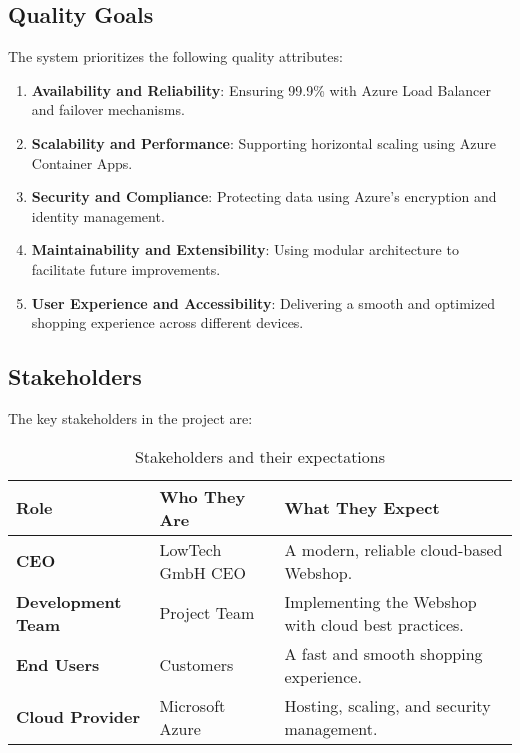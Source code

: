 \subsection{Quality Goals}
The system prioritizes the following quality attributes:

\begin{enumerate}
    \item \textbf{Availability and Reliability}: Ensuring 99.9\% with Azure Load Balancer and failover mechanisms.
    \item \textbf{Scalability and Performance}: Supporting horizontal scaling using Azure Container Apps.
    \item \textbf{Security and Compliance}: Protecting data using Azure’s encryption and identity management.
    \item \textbf{Maintainability and Extensibility}: Using modular architecture to facilitate future improvements.
    \item \textbf{User Experience and Accessibility}: Delivering a smooth and optimized shopping experience across different devices.
\end{enumerate}

\subsection{Stakeholders}
The key stakeholders in the project are:

\begin{center}
    
    \begin{table}[h]
        \centering
        \begin{tabular}{|p{}|p{}|p{}|}
            \hline
            \textbf{Role} & \textbf{Who They Are} & \textbf{What They Expect} \\ \hline
            \textbf{CEO} & LowTech GmbH CEO & A modern, reliable cloud-based Webshop. \\ \hline
            \textbf{Development Team} & Project Team & Implementing the Webshop with cloud best practices. \\ \hline
            \textbf{End Users} & Customers & A fast and smooth shopping experience. \\ \hline
            \textbf{Cloud Provider} & Microsoft Azure & Hosting, scaling, and security management. \\ \hline
        \end{tabular}
        \caption{Stakeholders and their expectations}
        \label{tab:stakeholders}
    \end{table}
\end{center}

